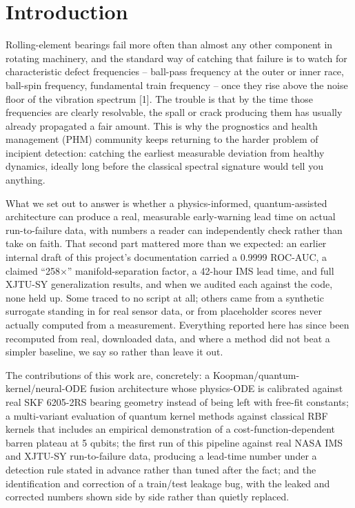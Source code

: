 \documentclass[3p,times,procedia]{elsarticle}
\begin{document}
\section{Introduction}
Rolling-element bearings fail more often than almost any other component in rotating machinery, and the standard way of catching that failure is to watch for characteristic defect frequencies -- ball-pass frequency at the outer or inner race, ball-spin frequency, fundamental train frequency -- once they rise above the noise floor of the vibration spectrum [1]. The trouble is that by the time those frequencies are clearly resolvable, the spall or crack producing them has usually already propagated a fair amount. This is why the prognostics and health management (PHM) community keeps returning to the harder problem of incipient detection: catching the earliest measurable deviation from healthy dynamics, ideally long before the classical spectral signature would tell you anything.

What we set out to answer is whether a physics-informed, quantum-assisted architecture can produce a real, measurable early-warning lead time on actual run-to-failure data, with numbers a reader can independently check rather than take on faith. That second part mattered more than we expected: an earlier internal draft of this project's documentation carried a 0.9999 ROC-AUC, a claimed ``258$\times$'' manifold-separation factor, a 42-hour IMS lead time, and full XJTU-SY generalization results, and when we audited each against the code, none held up. Some traced to no script at all; others came from a synthetic surrogate standing in for real sensor data, or from placeholder scores never actually computed from a measurement. Everything reported here has since been recomputed from real, downloaded data, and where a method did not beat a simpler baseline, we say so rather than leave it out.

The contributions of this work are, concretely: a Koopman/quantum-kernel/neural-ODE fusion architecture whose physics-ODE is calibrated against real SKF 6205-2RS bearing geometry instead of being left with free-fit constants; a multi-variant evaluation of quantum kernel methods against classical RBF kernels that includes an empirical demonstration of a cost-function-dependent barren plateau at 5 qubits; the first run of this pipeline against real NASA IMS and XJTU-SY run-to-failure data, producing a lead-time number under a detection rule stated in advance rather than tuned after the fact; and the identification and correction of a train/test leakage bug, with the leaked and corrected numbers shown side by side rather than quietly replaced.
\end{document}
